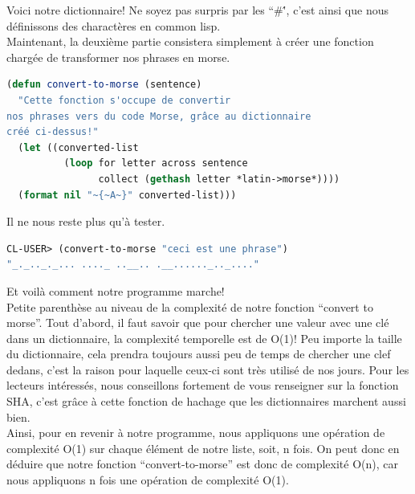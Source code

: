 \documentclass[a4paper, 12pt]{article}
\numberwithin{equation}{subsection}
\begin{document}
Voici notre dictionnaire! Ne soyez pas surpris par les ``\#\'', c'est ainsi que nous définissons des charactères en common lisp. \\
Maintenant, la deuxième partie consistera simplement à créer une fonction chargée de transformer nos phrases en morse. \\
\begin{lstlisting}[language=Lisp]
(defun convert-to-morse (sentence)
  "Cette fonction s'occupe de convertir
nos phrases vers du code Morse, grâce au dictionnaire
créé ci-dessus!"
  (let ((converted-list
          (loop for letter across sentence
                collect (gethash letter *latin->morse*))))
  (format nil "~{~A~}" converted-list)))
\end{lstlisting}
Il ne nous reste plus qu'à tester.
\begin{lstlisting}[language=Lisp]
CL-USER> (convert-to-morse "ceci est une phrase")
"_._.._._... ...._ ..__.. .__......_.._...."
\end{lstlisting}
Et voilà comment notre programme marche! \\
Petite parenthèse au niveau de la complexité de notre fonction ``convert to morse''. Tout d'abord, il faut savoir que pour chercher une valeur avec une clé dans un dictionnaire, la complexité temporelle est de O(1)! Peu importe la taille du dictionnaire, cela prendra toujours aussi peu de temps de chercher une clef dedans, c'est la raison pour laquelle ceux-ci sont très utilisé de nos jours.
Pour les lecteurs intéressés, nous conseillons fortement de vous renseigner sur la fonction SHA, c'est grâce à cette fonction de hachage que les dictionnaires marchent aussi bien. \\
Ainsi, pour en revenir à notre programme, nous appliquons une opération de complexité O(1) sur chaque élément de notre liste, soit, n fois. On peut donc en déduire que notre fonction ``convert-to-morse'' est donc de complexité O(n), car nous appliquons n fois une opération de complexité O(1). \\[0.2cm]
\end{document}
